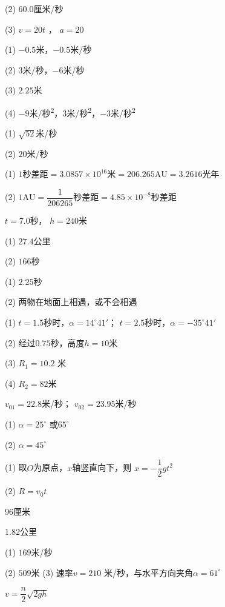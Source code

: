 (2) $ 60.0 $厘米/秒

(3) $ v = 2 0 t $  ， $ a = 2 0  $

\answer (1) $ - 0 .5 $米，$ -0.5 $米/秒

(2) $ 3 $米/秒，$ -6 $米/秒

(3) $ 2.25 $米

(4) $ -9 $米/秒\textsuperscript{2}，$ 3 $米/秒\textsuperscript{2}，$ -3 $米/秒\textsuperscript{2}

\answer (1) $\sqrt{52}$米/秒

(2) $ 20 $米/秒

\answer (1) $ 1 \text{秒差距} = 3 . 0 8 5 7 \times 1 0 ^ { 1 6 } \text{米} = 2 0 6. 2 6 5 \text{AU} = 3 . 2 6 1 6  \text{光年}$

(2) $1 \text{AU} = \dfrac { 1 } { 2 0 6 2 6 5 } \text{秒差距} = 4 . 8 5 \times 1 0 ^ { - 8 } \text{秒差距}$

\answer $ t = 7 . 0   $秒， $ h = 2 4 0   $米

\answer (1) $ 27.4 $公里

(2) $ 166 $秒

\answer (1) $ 2.25 $秒

(2) 两物在地面上相遇，或不会相遇

\answer (1) $ t = 1 . 5   $秒时，$  \alpha = 1 4 ^ { \circ } 4 1 '$； $ t = 2 .  5 $秒时，$  \alpha = - 3 5 ^{\circ} 4 1'  $

(2) 经过$ 0.75 $秒，高度$  h = 1 0 $米

(3) $ R _ { 1 } = 1 0 . 2  $ 米

(4) $ R _ { 2 } = 8 2   $米

\answer $ v _ { 0 1 } = 2 2 .  8 $米/秒； $ v _ { 0 2 } = 2 3 . 9 5   $米/秒

\answer (1) $ \alpha = 2 5 ^ { \circ } $  或$6 5 ^ { \circ } $

(2) $ \alpha = 4 5 ^ { \circ } $

\answer (1) 取$ O $为原点，$ x $轴竖直向下，则
$ x = - \dfrac { 1 } { 2 } g t ^ { 2 } $

(2) $ R = v _ { 0 } t  $

\answer $ 96 $厘米

\answer $ 1.82 $公里

\answer (1) $ 1 6 9   $米/秒

(2) $ 509 $米
(3) 速率$  v = 2 1 0  $ 米/秒，与水平方向夹角$ \alpha = 61^{\circ} $

\answer $ v = \dfrac { n } { 2 } \sqrt { 2 g h }  $

